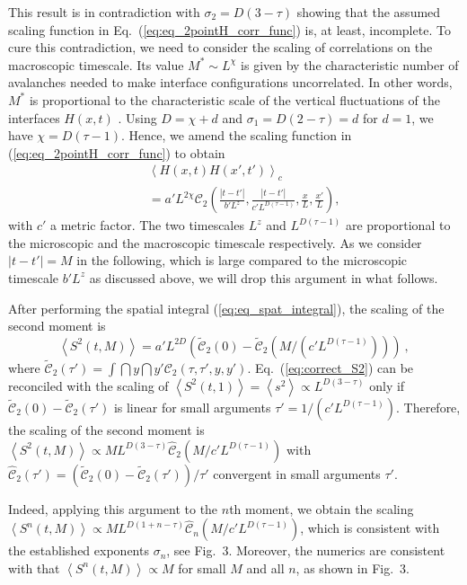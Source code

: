 \documentclass[doublecol]{epl2}
\newcommand{\ave}[1]{\left\langle{#1}\right\rangle}
\newcommand{\elabel}[1]{\label{eq:#1}}
\newcommand{\eref}[1]{(\ref{eq:#1})}
\newcommand{\Eref}[1]{Eq.~(\ref{eq:#1})}
\newcommand{\bungledXR}[2]{#2}
\begin{document}
This result is in contradiction with $\sigma_2=D(3-\tau)$ showing that the assumed scaling function in \Eref{eq_2pointH_corr_func} is, at least, incomplete.
To cure this contradiction, we need to consider the scaling of correlations on the macroscopic timescale. Its value $M^*\sim L^\chi$ is given by the characteristic number of avalanches needed to make interface configurations uncorrelated. In other words, $M^*$ is proportional to the characteristic scale of the vertical fluctuations of the interfaces $H(x,t)$ \cite{PhysRevLett.77.111}. Using $D=\chi+d$ and $\sigma_1=D(2-\tau)=d$ for $d=1$, we have $\chi = D(\tau-1)$. Hence, we amend the scaling function in \eref{eq_2pointH_corr_func} to obtain
\begin{eqnarray}
&&\ave{H(x,t)H(x',t')}_c \nonumber\\
&&= a' L^{2\chi}\mathcal{C}_2\left(\frac{|t-t'|}{b'L^z},\frac{|t-t'|}{c'L^{D(\tau-1)}},\frac{x}{L},\frac{x'}{L}\right),\elabel{eq_2pointH_corr_func_right}
\end{eqnarray}
with $c'$ a metric factor. The two timescales $L^z$ and $L^{D(\tau-1)}$ are
proportional to the microscopic and the macroscopic timescale respectively.
As we consider $|t-t'|=M$ in the following, which is large compared to the
microscopic timescale $b'L^z$ as discussed above, we will drop this argument
in what follows.

After performing the spatial integral \eref{eq_spat_integral}, the scaling
of the second moment is 
\begin{equation}\elabel{correct_S2}
\ave{S^2(t,M)}= a'L^{2D}\left(\tilde{\mathcal{C}}_2
(0)-\tilde{\mathcal{C}}_2\left(M/\left(c'L^{D(\tau-1)}\right)\right)\right)\ ,
\end{equation}
where $\tilde{\mathcal{C}}_2\left(\tau'\right)=\int\dint{y}\dint{y'} \mathcal{C}_2(\tau,\tau',y,y')$.
\Eref{correct_S2} 
 can be reconciled with the scaling of $
\ave{S^2(t,1)}=\ave{s^2}\propto L^{D(3-\tau)}$ only if $\tilde{\mathcal{C}}_2\left(0\right)-\tilde{\mathcal{C}}_2\left(\tau'\right)$
is linear for small arguments $\tau'=1/(c'L^{D(\tau-1)})$. Therefore, the scaling
of the second moment 
is $\ave{S^2(t,M)}\propto ML^{D(3-\tau)}\hat{\mathcal{C}}_2\left(M/c'L^{D
(\tau-1)}\right)$ with $\hat{\mathcal{C}}_2\left(\tau'\right)=\left(\tilde{\mathcal{C}}_2\left(0\right)-\tilde{\mathcal{C}}_2\left(\tau'\right)\right)/\tau'$ convergent in small arguments
$\tau'$.

Indeed, applying this argument to the $n$th moment, we obtain the scaling
$\ave{S^n(t,M)}\propto ML^{D(1+n-\tau)}\hat{\mathcal{C}}_n\left(M/c'L^{D(\tau-1)}\right)$,
which is consistent with the established exponents $\sigma_n$, see \bungledXR
{}{Fig.~3}. Moreover, the numerics are consistent with that $\ave{S^n(t,M)}\propto M$
for small $M$ and all $n$, as shown in \bungledXR{}{Fig.~3}.
\end{document}
